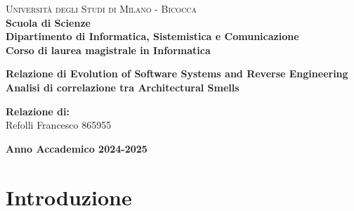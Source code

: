 \documentclass[a4paper,11pt,oneside, table]{article}
\begin{document}
\begin{titlepage}
  \noindent
  \begin{minipage}[t]{0.19\textwidth}
  \end{minipage}
  \begin{minipage}[t]{0.81\textwidth}
    {
      {\textsc{Università degli Studi di Milano - Bicocca}} \\
      \textbf{Scuola di Scienze} \\
      \textbf{Dipartimento di Informatica, Sistemistica e Comunicazione} \\
      \textbf{Corso di laurea magistrale in Informatica} \\
      \par
    }
  \end{minipage}
  \vspace{40mm}
  \begin{center}
    {\LARGE{
      \textbf{Relazione di Evolution of Software Systems and Reverse Engineering \\
      Analisi di correlazione tra Architectural Smells}
      \par
    }}
  \end{center}

  \vspace{50mm}

  \vspace{15mm}

  \begin{flushright}
    {\large \textbf{Relazione di:}} \\
    \large{Refolli Francesco} \large{865955} \\
  \end{flushright}

  \vspace{40mm}
  \begin{center}
    {\large{\bf Anno Accademico 2024-2025}}
  \end{center}
  \restoregeometry
\end{titlepage}

\printindex
\tableofcontents
\renewcommand{\baselinestretch}{1.5}

\section{Introduzione}
\end{document}
